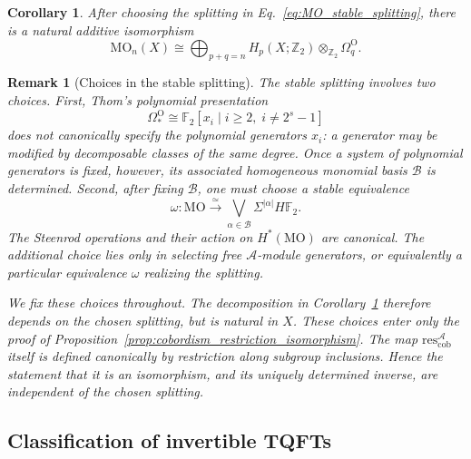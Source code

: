 \documentclass[aps,prx,reprint,superscriptaddress,twocolumn,amsmath,amssymb,amsfonts, nofootinbib]{revtex4-2}
\newcommand{\res}{\text{res}}
\theoremstyle{apsstyle}
\newtheorem{remark}[theorem]{Remark}
\newtheorem{corollary}[theorem]{Corollary}
\begin{document}
\begin{corollary}
\label{cor:MO_additive_decomposition}
After choosing the splitting in
Eq.~\eqref{eq:MO_stable_splitting}, there is a natural additive
isomorphism
\begin{equation}
    \mathrm{MO}_n(X)
    \cong
    \bigoplus_{p+q=n}
    H_p(X;\mathbb Z_2)\otimes_{\mathbb Z_2}\Omega_q^{\mathrm O}.
\end{equation}
\end{corollary}


\begin{remark}[Choices in the stable splitting]
\label{rem:MO_splitting_noncanonical}
The stable splitting involves two choices. First, Thom's polynomial presentation
\begin{equation*}
    \Omega_*^{\mathrm O}
    \cong
    \mathbb F_2[x_i\mid i\geq2,\;i\neq2^s-1]
\end{equation*}
does not canonically specify the polynomial generators $x_i$: a generator may be modified by decomposable classes of the same degree. Once a system of polynomial generators is fixed, however, its associated homogeneous monomial basis $\mathcal B$ is determined. Second, after fixing $\mathcal B$, one must choose a stable equivalence
\begin{equation*}
    \omega: \mathrm{MO}
    \xrightarrow{\;\simeq\;}
    \bigvee_{\alpha\in\mathcal B}
    \Sigma^{|\alpha|}H\mathbb F_2.
\end{equation*}
The Steenrod operations and their action on $H^*(\mathrm{MO})$ are canonical. The additional choice lies only in selecting free $\mathcal A$-module generators, or equivalently a particular equivalence $\omega$ realizing the splitting.

\noindent We fix these choices throughout. The decomposition in Corollary~\ref{cor:MO_additive_decomposition} therefore depends on the chosen splitting, but is natural in $X$. These choices enter only the proof of Proposition~\ref{prop:cobordism_restriction_isomorphism}. The map $\res_{\mathrm{cob}}^{\mathcal A}$ itself is defined canonically by restriction along subgroup inclusions. Hence the statement that it is an isomorphism, and its uniquely determined inverse, are independent of the chosen splitting.
\end{remark}

\subsection{Classification of invertible TQFTs}
\label{app:cob1}
\end{document}
